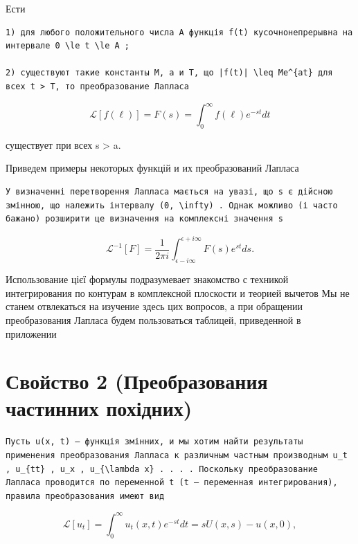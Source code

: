 \documentclass[
  ukrainian,
]{article}
\begin{document}
Ести

\begin{verbatim}
1) для любого положительного числа A функція f(t) кусочнонепрерывна на интервале 0 \le t \le A ;

2) существуют такие константы M, a и T, що |f(t)| \leq Me^{at} для всех t > T, то преобразование Лапласа
\end{verbatim}

\[
\mathscr{L}[f(\ell)] = F(s) = \int_{0}^{\infty} f(\ell) e^{-st} dt
\]

существует при всех s \textgreater{} a.

Приведем примеры некоторых функцій и их преобразований Лапласа

\begin{verbatim}
У визначенні перетворення Лапласа мається на увазі, що s є дійсною змінною, що належить інтервалу (0, \infty) . Однак можливо (і часто бажано) розширити це визначення на комплексні значення s
\end{verbatim}

\[
\mathscr{L}^{-1}[F] = \frac{1}{2\pi i} \int_{\epsilon - i\infty}^{\epsilon + i\infty} F(s) e^{st} ds.
\]

Использование цієї формулы подразумевает знакомство с техникой
интегрирования по контурам в комплексной плоскости и теорией вычетов Мы
не станем отвлекаться на изучение здесь цих вопросов, а при обращении
преобразования Лапласа будем пользоваться таблицей, приведенной в
приложении

\section{Свойство 2 (Преобразования частинних
похідних)}\label{ux441ux432ux43eux439ux441ux442ux432ux43e-2-ux43fux440ux435ux43eux431ux440ux430ux437ux43eux432ux430ux43dux438ux44f-ux447ux430ux441ux442ux438ux43dux43dux438ux445-ux43fux43eux445ux456ux434ux43dux438ux445}

\begin{verbatim}
Пусть u(x, t) — функція змінних, и мы хотим найти результаты применения преобразования Лапласа к различным частным производным u_t , u_{tt} , u_x , u_{\lambda x} . . . . Поскольку преобразование Лапласа проводится по переменной t (t — переменная интегрирования), правила преобразования имеют вид
\end{verbatim}

\[
\mathcal{L}\left[u_{t}\right] = \int_{0}^{\infty} u_{t}(x, t) e^{-st} dt = sU(x, s) - u(x, 0),
\]
\end{document}
